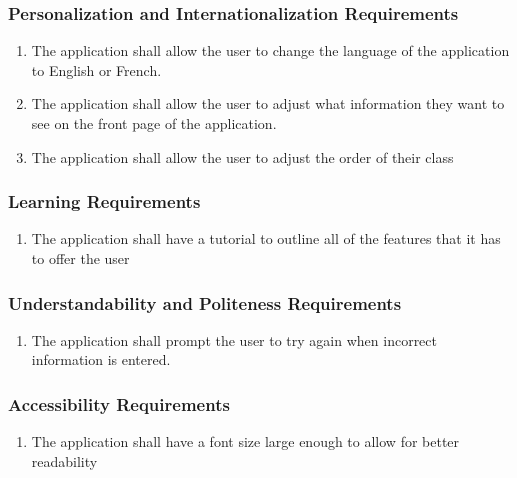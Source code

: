 \documentclass[]{article}
\begin{document}
\subsubsection{Personalization and Internationalization Requirements}
\label{ssub:personalization_and_internationalization_requirements}
\begin{enumerate}[{UH}1. ]
	\item The application shall allow the user to change the language of the
application to English or French.
	\item The application shall allow the user to adjust what information they want
to see on
the front page of the application.
	\item The application shall allow the user to adjust the order of their class
\end{enumerate}

\subsubsection{Learning Requirements}
\label{ssub:learning_requirements}
\begin{enumerate}[{UH}1. ]
		\item The application shall have a tutorial to outline all of the features
that it has to offer the user
\end{enumerate}

\subsubsection{Understandability and Politeness Requirements}
\label{ssub:understandability_and_politeness_requirements}
\begin{enumerate}[{UH}1. ]
	\item The application shall prompt the user to try again when incorrect information is entered.
\end{enumerate}

\subsubsection{Accessibility Requirements}
\label{ssub:accessibility_requirements}
\begin{enumerate}[{UH}1. ]
	\item The application shall have a font size large enough to allow for better readability
\end{enumerate}
\end{document}
